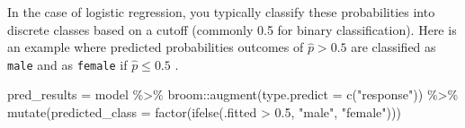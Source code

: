 \documentclass[
  letterpaper,
  DIV=11,
  numbers=noendperiod]{scrartcl}
\newenvironment{Shaded}{\begin{snugshade}}{\end{snugshade}}
\newcommand{\AttributeTok}[1]{\textcolor[rgb]{0.40,0.45,0.13}{#1}}
\newcommand{\FloatTok}[1]{\textcolor[rgb]{0.68,0.00,0.00}{#1}}
\newcommand{\FunctionTok}[1]{\textcolor[rgb]{0.28,0.35,0.67}{#1}}
\newcommand{\NormalTok}[1]{\textcolor[rgb]{0.00,0.23,0.31}{#1}}
\newcommand{\OtherTok}[1]{\textcolor[rgb]{0.00,0.23,0.31}{#1}}
\newcommand{\SpecialCharTok}[1]{\textcolor[rgb]{0.37,0.37,0.37}{#1}}
\newcommand{\StringTok}[1]{\textcolor[rgb]{0.13,0.47,0.30}{#1}}
\begin{document}
In the case of logistic regression, you typically classify these
probabilities into discrete classes based on a cutoff (commonly 0.5 for
binary classification). Here is an example where predicted probabilities
outcomes of \(\hat{p} > 0.5\) are classified as \texttt{male} and as
\texttt{female} if \(\hat{p} \leq 0.5\) .

\begin{Shaded}
\begin{Highlighting}[]
\NormalTok{pred\_results }\OtherTok{=}\NormalTok{ model }\SpecialCharTok{\%\textgreater{}\%} 
\NormalTok{  broom}\SpecialCharTok{::}\FunctionTok{augment}\NormalTok{(}\AttributeTok{type.predict =} \FunctionTok{c}\NormalTok{(}\StringTok{"response"}\NormalTok{)) }\SpecialCharTok{\%\textgreater{}\%}
  \FunctionTok{mutate}\NormalTok{(}\AttributeTok{predicted\_class =} 
           \FunctionTok{factor}\NormalTok{(}\FunctionTok{ifelse}\NormalTok{(.fitted }\SpecialCharTok{\textgreater{}} \FloatTok{0.5}\NormalTok{, }\StringTok{"male"}\NormalTok{, }\StringTok{"female"}\NormalTok{)))}
\end{Highlighting}
\end{Shaded}
\end{document}
